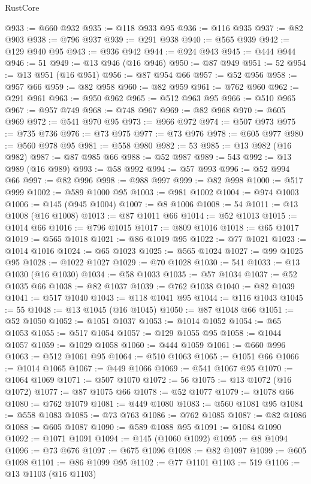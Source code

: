 \begin{lexlean}{RustCore}
\begin{coremodule}
@933 := @660 @932
@935 := @118 @933 @95
@936 := @116 @935
@937 := @82 @903
@938 := @796 @937
@939 := @291 @938
@940 := @565 @939
@942 := @129 @940 @95
@943 := @936 @942
@944 := @924 @943
@945 := @444 @944
@946 := 51
@949 := @13 @946 (@16 @946)
@950 := @87 @949
@951 := 52
@954 := @13 @951 (@16 @951)
@956 := @87 @954 @66
@957 := @52 @956
@958 := @957 @66
@959 := @82 @958
@960 := @82 @959
@961 := @762 @960
@962 := @291 @961
@963 := @950 @962
@965 := @512 @963 @95
@966 := @510 @965
@967 := @957 @749
@968 := @748 @967
@969 := @82 @968
@970 := @605 @969
@972 := @541 @970 @95
@973 := @966 @972
@974 := @507 @973
@975 := @735 @736
@976 := @73 @975
@977 := @73 @976
@978 := @605 @977
@980 := @560 @978 @95
@981 := @558 @980
@982 := 53
@985 := @13 @982 (@16 @982)
@987 := @87 @985 @66
@988 := @52 @987
@989 := 543
@992 := @13 @989 (@16 @989)
@993 := @58 @992
@994 := @57 @993
@996 := @52 @994 @66
@997 := @82 @996
@998 := @988 @997
@999 := @82 @998
@1000 := @517 @999
@1002 := @589 @1000 @95
@1003 := @981 @1002
@1004 := @974 @1003
@1006 := @145 (@945 @1004)
@1007 := @8 @1006
@1008 := 54
@1011 := @13 @1008 (@16 @1008)
@1013 := @87 @1011 @66
@1014 := @52 @1013
@1015 := @1014 @66
@1016 := @796 @1015
@1017 := @809 @1016
@1018 := @65 @1017
@1019 := @565 @1018
@1021 := @86 @1019 @95
@1022 := @77 @1021
@1023 := @1014 @1016
@1024 := @65 @1023
@1025 := @565 @1024
@1027 := @99 @1025 @95
@1028 := @1022 @1027
@1029 := @70 @1028
@1030 := 541
@1033 := @13 @1030 (@16 @1030)
@1034 := @58 @1033
@1035 := @57 @1034
@1037 := @52 @1035 @66
@1038 := @82 @1037
@1039 := @762 @1038
@1040 := @82 @1039
@1041 := @517 @1040
@1043 := @118 @1041 @95
@1044 := @116 @1043
@1045 := 55
@1048 := @13 @1045 (@16 @1045)
@1050 := @87 @1048 @66
@1051 := @52 @1050
@1052 := @1051 @1037
@1053 := @1014 @1052
@1054 := @65 @1053
@1055 := @517 @1054
@1057 := @129 @1055 @95
@1058 := @1044 @1057
@1059 := @1029 @1058
@1060 := @444 @1059
@1061 := @660 @996
@1063 := @512 @1061 @95
@1064 := @510 @1063
@1065 := @1051 @66
@1066 := @1014 @1065
@1067 := @449 @1066
@1069 := @541 @1067 @95
@1070 := @1064 @1069
@1071 := @507 @1070
@1072 := 56
@1075 := @13 @1072 (@16 @1072)
@1077 := @87 @1075 @66
@1078 := @52 @1077
@1079 := @1078 @66
@1080 := @762 @1079
@1081 := @449 @1080
@1083 := @560 @1081 @95
@1084 := @558 @1083
@1085 := @73 @763
@1086 := @762 @1085
@1087 := @82 @1086
@1088 := @605 @1087
@1090 := @589 @1088 @95
@1091 := @1084 @1090
@1092 := @1071 @1091
@1094 := @145 (@1060 @1092)
@1095 := @8 @1094
@1096 := @73 @676
@1097 := @675 @1096
@1098 := @82 @1097
@1099 := @605 @1098
@1101 := @86 @1099 @95
@1102 := @77 @1101
@1103 := 519
@1106 := @13 @1103 (@16 @1103)

\end{coremodule}
\end{lexlean}
